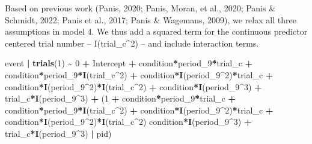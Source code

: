 \documentclass[
  man,floatsintext]{apa6}
\newenvironment{Shaded}{\begin{snugshade}}{\end{snugshade}}
\newcommand{\DecValTok}[1]{\textcolor[rgb]{0.00,0.00,0.81}{#1}}
\newcommand{\FunctionTok}[1]{\textcolor[rgb]{0.13,0.29,0.53}{\textbf{#1}}}
\newcommand{\NormalTok}[1]{#1}
\newcommand{\SpecialCharTok}[1]{\textcolor[rgb]{0.81,0.36,0.00}{\textbf{#1}}}
\begin{document}
Based on previous work (Panis, 2020; Panis, Moran, et al., 2020; Panis \& Schmidt, 2022; Panis et al., 2017; Panis \& Wagemans, 2009), we relax all three assumptions in model 4. We thus add a squared term for the continuous predictor centered trial number -- I(trial\_c\^{}2) -- and include interaction terms.

\scriptsize

\begin{Shaded}
\begin{Highlighting}[]
\NormalTok{event }\SpecialCharTok{|} \FunctionTok{trials}\NormalTok{(}\DecValTok{1}\NormalTok{) }\SpecialCharTok{\textasciitilde{}} \DecValTok{0} \SpecialCharTok{+}\NormalTok{ Intercept }\SpecialCharTok{+} 
\NormalTok{                           condition}\SpecialCharTok{*}\NormalTok{period\_9}\SpecialCharTok{*}\NormalTok{trial\_c }\SpecialCharTok{+}  
\NormalTok{                           condition}\SpecialCharTok{*}\NormalTok{period\_9}\SpecialCharTok{*}\FunctionTok{I}\NormalTok{(trial\_c}\SpecialCharTok{\^{}}\DecValTok{2}\NormalTok{) }\SpecialCharTok{+}
\NormalTok{                           condition}\SpecialCharTok{*}\FunctionTok{I}\NormalTok{(period\_9}\SpecialCharTok{\^{}}\DecValTok{2}\NormalTok{)}\SpecialCharTok{*}\NormalTok{trial\_c }\SpecialCharTok{+} 
\NormalTok{                           condition}\SpecialCharTok{*}\FunctionTok{I}\NormalTok{(period\_9}\SpecialCharTok{\^{}}\DecValTok{2}\NormalTok{)}\SpecialCharTok{*}\FunctionTok{I}\NormalTok{(trial\_c}\SpecialCharTok{\^{}}\DecValTok{2}\NormalTok{) }\SpecialCharTok{+} 
\NormalTok{                           condition}\SpecialCharTok{*}\FunctionTok{I}\NormalTok{(period\_9}\SpecialCharTok{\^{}}\DecValTok{3}\NormalTok{) }\SpecialCharTok{+} 
\NormalTok{                           trial\_c}\SpecialCharTok{*}\FunctionTok{I}\NormalTok{(period\_9}\SpecialCharTok{\^{}}\DecValTok{3}\NormalTok{) }\SpecialCharTok{+} 
\NormalTok{                           (}\DecValTok{1} \SpecialCharTok{+}\NormalTok{  condition}\SpecialCharTok{*}\NormalTok{period\_9}\SpecialCharTok{*}\NormalTok{trial\_c }\SpecialCharTok{+} 
\NormalTok{                                 condition}\SpecialCharTok{*}\NormalTok{period\_9}\SpecialCharTok{*}\FunctionTok{I}\NormalTok{(trial\_c}\SpecialCharTok{\^{}}\DecValTok{2}\NormalTok{) }\SpecialCharTok{+}  
\NormalTok{                                 condition}\SpecialCharTok{*}\FunctionTok{I}\NormalTok{(period\_9}\SpecialCharTok{\^{}}\DecValTok{2}\NormalTok{)}\SpecialCharTok{*}\NormalTok{trial\_c }\SpecialCharTok{+} 
\NormalTok{                                 condition}\SpecialCharTok{*}\FunctionTok{I}\NormalTok{(period\_9}\SpecialCharTok{\^{}}\DecValTok{2}\NormalTok{)}\SpecialCharTok{*}\FunctionTok{I}\NormalTok{(trial\_c}\SpecialCharTok{\^{}}\DecValTok{2}\NormalTok{)   }
\NormalTok{                                 condition}\SpecialCharTok{*}\FunctionTok{I}\NormalTok{(period\_9}\SpecialCharTok{\^{}}\DecValTok{3}\NormalTok{) }\SpecialCharTok{+} 
\NormalTok{                                 trial\_c}\SpecialCharTok{*}\FunctionTok{I}\NormalTok{(period\_9}\SpecialCharTok{\^{}}\DecValTok{3}\NormalTok{) }\SpecialCharTok{|}\NormalTok{ pid)}
\end{Highlighting}
\end{Shaded}
\end{document}
